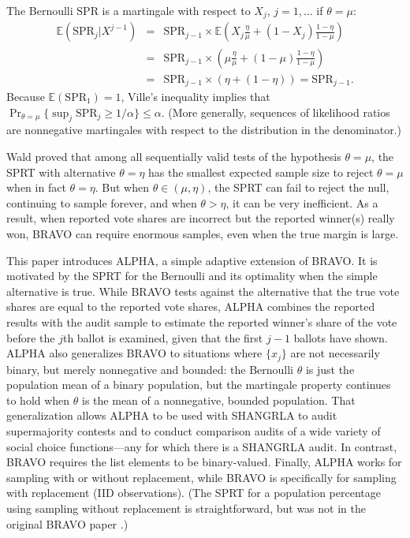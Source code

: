 \documentclass[12pt,runningheads]{llncs}
\newcommand{\EE}{\mathbb{E}}
\newcommand{\SPR}{\ensuremath{\mathrm{SPR}}}
\begin{document}
{The Bernoulli \SPR{} is a martingale with respect to $X_j$, $j=1, \ldots$ if $\theta = \mu$:
\begin{eqnarray}
\EE (\SPR_j | X^{j-1}) &=& \SPR_{j-1} \times \EE \left ( X_j \frac{\eta}{\mu} + (1-X_j) \frac{1-\eta}{1-\mu} \right ) \nonumber \\
&=& \SPR_{j-1} \times \left ( \mu \frac{\eta}{\mu} + (1-\mu) \frac{1-\eta}{1-\mu} \right )  \nonumber \\
&=& \SPR_{j-1} \times \left (\eta + (1-\eta) \right ) = \SPR_{j-1}.
\end{eqnarray}
Because $ \EE (\SPR_1) = 1$, Ville's inequality implies that $\Pr_{\theta = \mu} \{\sup_j \SPR_j \ge 1/\alpha \} \le \alpha$.
(More generally, sequences of likelihood ratios are nonnegative martingales with respect to the distribution in the
denominator.)

Wald \cite{wald45} proved that among all sequentially valid tests of the hypothesis $\theta = \mu$, the SPRT with alternative
$\theta = \eta$ has the smallest expected sample size to reject $\theta=\mu$ when in fact $\theta = \eta$.
But when $\theta \in (\mu, \eta)$, the SPRT can fail to reject the null, continuing to sample forever,
and when $\theta > \eta$, it can be very inefficient.
As a result, when reported vote shares are incorrect but the reported winner(s) really won, BRAVO can require 
enormous samples, even when the true margin is large.

This paper introduces ALPHA, a simple adaptive extension of BRAVO.
It is motivated by the SPRT for the Bernoulli and its optimality when the simple alternative is true.
While BRAVO tests against the alternative that the true vote shares are equal to the reported vote shares,
ALPHA combines the reported results with the audit sample to
estimate the reported winner's share of the vote before the $j$th ballot is examined, given
that the first $j-1$ ballots have shown. 
ALPHA also generalizes BRAVO to situations where $\{x_j\}$ are not necessarily binary, 
but merely nonnegative and bounded: the Bernoulli $\theta$ is just the population mean of a binary population,
but the martingale property continues to hold when $\theta$ is the mean of a nonnegative, bounded population.
That generalization allows ALPHA to be used with SHANGRLA to audit supermajority contests
and to conduct comparison audits of a wide variety of social choice functions---any for which there is a
SHANGRLA audit.
In contrast, BRAVO requires the list elements to be binary-valued.
Finally, ALPHA works for sampling with or without replacement, while BRAVO is specifically for sampling 
with replacement (IID observations).
(The SPRT for a population percentage using sampling without replacement is straightforward, but was not
in the original BRAVO paper \cite{lindemanEtal12}.)

}
\end{document}
